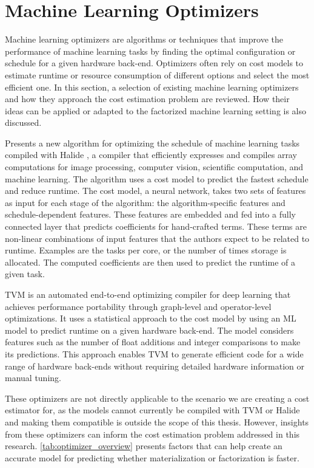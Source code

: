 \section{Machine Learning Optimizers}
\label{sec:3-ml-optimizers}
Machine learning optimizers are algorithms or techniques that improve the performance of machine learning tasks by finding the optimal configuration or schedule for a given hardware back-end. Optimizers often rely on cost models to estimate runtime or resource consumption of different options and select the most efficient one. In this section, a selection of existing machine learning optimizers and how they approach the cost estimation problem are reviewed. How their ideas can be applied or adapted to the factorized machine learning setting is also discussed.

\cite{halide_cost_model} Presents a new algorithm for optimizing the schedule of machine learning tasks compiled with Halide \cite{halide}, a compiler that efficiently expresses and compiles array computations for image processing, computer vision, scientific computation, and machine learning. The algorithm uses a cost model to predict the fastest schedule and reduce runtime. The cost model, a neural network, takes two sets of features as input for each stage of the algorithm: the algorithm-specific features and schedule-dependent features. These features are embedded and fed into a fully connected layer that predicts coefficients for hand-crafted terms. These terms are non-linear combinations of input features that the authors expect to be related to runtime. Examples are the tasks per core, or the number of times storage is allocated. The computed coefficients are then used to predict the runtime of a given task.

TVM \cite{tvm} is an automated end-to-end optimizing compiler for deep learning that achieves performance portability through graph-level and operator-level optimizations. It uses a statistical approach to the cost model by using an ML model to predict runtime on a given hardware back-end. The model considers features such as the number of float additions and integer comparisons to make its predictions. This approach enables TVM to generate efficient code for a wide range of hardware back-ends without requiring detailed hardware information or manual tuning.

These optimizers are not directly applicable to the scenario we are creating a cost estimator for, as the models cannot currently be compiled with TVM or Halide and making them compatible is outside the scope of this thesis. However, insights from these optimizers can inform the cost estimation problem addressed in this research. \autoref{tab:optimizer_overview} presents factors that can help create an accurate model for predicting whether materialization or factorization is faster.

